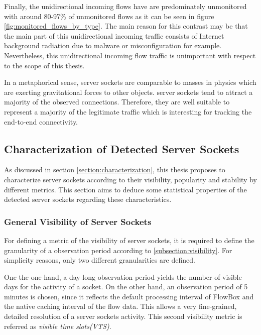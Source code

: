 Finally, the unidirectional incoming flows have are predominately unmonitored 
with around 80-97\% of unmonitored flows as it can be seen in figure 
\ref{fig:monitored_flows_by_type}. The main reason for this contrast may be that 
the main part of this unidirectional incoming traffic consists of Internet 
background radiation \citep{Wustrow10,Pang04} due to malware or misconfiguration 
for example. Nevertheless, this unidirectional incoming flow traffic is 
unimportant with respect to the scope of this thesis.

In a metaphorical sense, \glspl{server socket} are comparable to masses in 
physics which are exerting gravitational forces to other objects. \Glspl{server 
socket} tend to attract a majority of the observed connections. Therefore, they 
are well suitable to represent a majority of the legitimate traffic which is 
interesting for tracking the end-to-end connectivity.

\newpage
\subsection{Characterization of Detected Server Sockets}

As discussed in section \ref{section:characterization}, this thesis proposes to 
characterize \glspl{server socket} according to their visibility, popularity and 
stability by different metrics. This section aims to deduce some statistical 
properties of the detected \glspl{server socket} regarding these 
characteristics.

\subsubsection{General Visibility of Server Sockets}

For defining a metric of the visibility of \glspl{server socket}, it is required 
to define the granularity of a observation period according to 
\ref{subsection:visibility}. For simplicity reasons, only two different 
granularities are defined. 

One the one hand, a day long observation period yields the number of visible 
days for the activity of a socket. On the other hand, an observation period of 5 
minutes is chosen, since it reflects the default processing interval of FlowBox 
and the native caching interval of the flow data. This allows a very 
fine-grained, detailed resolution of a \glspl{server socket} activity. This 
second visibility metric is referred as \emph{visible time slots(VTS)}.

